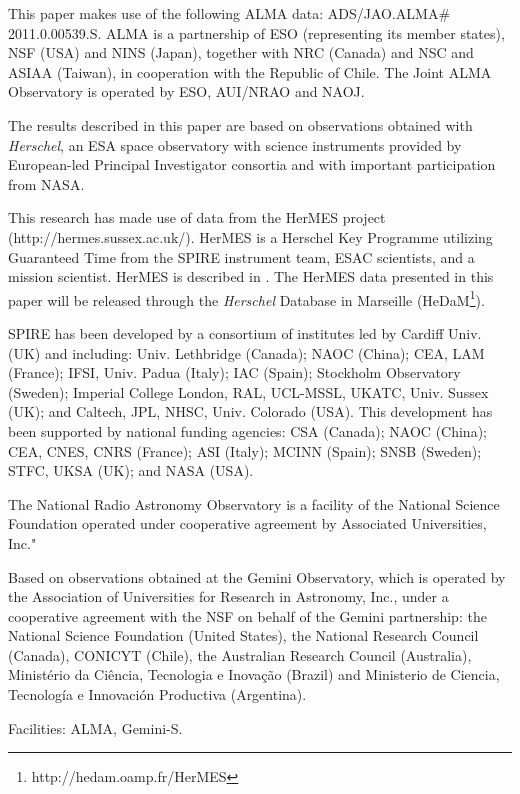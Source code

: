 \documentclass[iop]{emulateapj}
\begin{document}
\begin{acknowledgments}

This paper makes use of the following ALMA data: ADS/JAO.ALMA\# 2011.0.00539.S.
ALMA is a partnership of ESO (representing its member states), NSF (USA) and
NINS (Japan), together with NRC (Canada) and NSC and ASIAA (Taiwan), in
cooperation with the Republic of Chile. The Joint ALMA Observatory is operated
by ESO, AUI/NRAO and NAOJ.

The results described in this paper are based on observations obtained with
{\it Herschel}, an ESA space observatory with science instruments provided by
European-led Principal Investigator consortia and with important participation
from NASA.  

This research has made use of data from the HerMES project
(http://hermes.sussex.ac.uk/). HerMES is a Herschel Key Programme utilizing
Guaranteed Time from the SPIRE instrument team, ESAC scientists, and a mission
scientist. HerMES is described in \citet{Oliver:2012lr}.  The HerMES data
presented in this paper will be released through the {\em Herschel} Database in
Marseille (HeDaM\footnote{http://hedam.oamp.fr/HerMES}).

SPIRE has been developed by a consortium of institutes led by Cardiff Univ.
(UK) and including: Univ. Lethbridge (Canada); NAOC (China); CEA, LAM (France);
IFSI, Univ. Padua (Italy); IAC (Spain); Stockholm Observatory (Sweden);
Imperial College London, RAL, UCL-MSSL, UKATC, Univ. Sussex (UK); and Caltech,
JPL, NHSC, Univ. Colorado (USA). This development has been supported by
national funding agencies: CSA (Canada); NAOC (China); CEA, CNES, CNRS
(France); ASI (Italy); MCINN (Spain); SNSB (Sweden); STFC, UKSA (UK); and NASA
(USA).

The National Radio Astronomy Observatory is a facility of the National Science Foundation operated under cooperative agreement by Associated Universities, Inc."

Based on observations obtained at the Gemini Observatory, which is operated by
the Association of Universities for Research in Astronomy, Inc., under a
cooperative agreement with the NSF on behalf of the Gemini partnership: the
National Science Foundation (United States), the National Research Council
(Canada), CONICYT (Chile), the Australian Research Council (Australia),
Minist\'erio da Ci\^encia, Tecnologia e Inova\c{c}\~ao (Brazil) and Ministerio
de Ciencia, Tecnolog\'ia e Innovaci\'on Productiva (Argentina).  

Facilities: ALMA, Gemini-S.

\end{acknowledgments}





\end{document}
